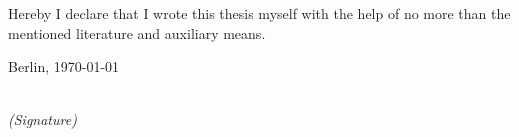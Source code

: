 \newpage

\thispagestyle{empty}

\begin{large}

\vspace*{6cm}

\noindent
Hereby I declare that I wrote this thesis myself with the help of no more than the mentioned literature and auxiliary means.
\vspace{2cm}

\noindent
Berlin, \today

\vspace{3cm}

\hspace*{7cm}%
\dotfill\\
\hspace*{8.5cm}%
\textit{(Signature)}

\end{large}
